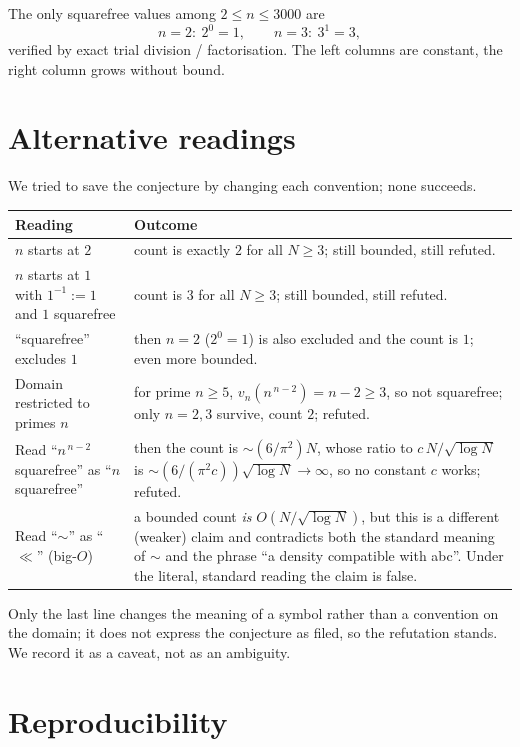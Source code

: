 \documentclass[11pt]{article}
\theoremstyle{definition}
\theoremstyle{remark}
\begin{document}
The only squarefree values among $2 \le n \le 3000$ are
\[
n = 2:\ 2^{0} = 1, \qquad n = 3:\ 3^{1} = 3 ,
\]
verified by exact trial division / factorisation. The left columns are
constant, the right column grows without bound.

\section{Alternative readings}\label{sec:readings}

We tried to save the conjecture by changing each convention; none succeeds.

\begin{center}
\begin{tabular}{p{} p{}}
\toprule
Reading & Outcome \\
\midrule
$n$ starts at $2$ & count is exactly $2$ for all $N \ge 3$; still bounded,
  still refuted. \\
$n$ starts at $1$ with $1^{-1} := 1$ and $1$ squarefree & count is $3$ for all
  $N\ge 3$; still bounded, still refuted. \\
``squarefree'' excludes $1$ & then $n=2$ ($2^0=1$) is also excluded and the
  count is $1$; even more bounded. \\
Domain restricted to primes $n$ & for prime $n \ge 5$,
  $v_n(n^{\,n-2}) = n-2 \ge 3$, so not squarefree; only $n=2,3$ survive, count
  $2$; refuted. \\
Read ``$n^{\,n-2}$ squarefree'' as ``$n$ squarefree'' & then the count is
  $\sim (6/\pi^2)N$, whose ratio to $c\,N/\sqrt{\log N}$ is
  $\sim (6/(\pi^2 c))\sqrt{\log N}\to\infty$, so no constant $c$ works;
  refuted. \\
Read ``$\sim$'' as ``$\ll$'' (big-$O$) & a bounded count \emph{is}
  $O(N/\sqrt{\log N})$, but this is a different (weaker) claim and contradicts
  both the standard meaning of $\sim$ and the phrase ``a density compatible
  with abc''. Under the literal, standard reading the claim is false. \\
\bottomrule
\end{tabular}
\end{center}

Only the last line changes the meaning of a symbol rather than a convention on
the domain; it does not express the conjecture as filed, so the refutation
stands. We record it as a caveat, not as an ambiguity.

\section{Reproducibility}
\end{document}
